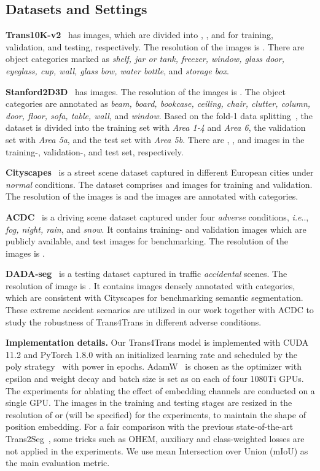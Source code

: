 \documentclass[journal]{IEEEtran}
\makeatletter
\DeclareRobustCommand\onedot{\futurelet\@let@token\@onedot}
\def\@onedot{\ifx\@let@token.\else.\null\fi\xspace}
\def\ie{\emph{i.e}\onedot} \def\Ie{\emph{I.e}\onedot}
\makeatother
\begin{document}
\subsection{Datasets and Settings}
\label{sec:settings}
\noindent\textbf{Trans10K-v2}~\cite{xie2021segmenting} has  images, which are divided into , , and  for training, validation, and testing, respectively. The  resolution of the images is . There are  object categories marked as \emph{shelf, jar or tank, freezer, window, glass door, eyeglass, cup, wall, glass bow, water bottle}, and \emph{storage box}.

\noindent\textbf{Stanford2D3D}~\cite{stanford2d3d} has  images. The resolution of the images is . The  object categories are annotated as \emph{beam, board, bookcase, ceiling, chair, clutter, column, door, floor, sofa, table, wall}, and \emph{window}. Based on the fold-1 data splitting~\cite{stanford2d3d}, the dataset is divided into the training set with \emph{Area 1-4} and \emph{Area 6}, the validation set with \emph{Area 5a}, and the test set with \emph{Area 5b}. There are , , and  images in the training-, validation-, and test set, respectively. 

\noindent\textbf{Cityscapes}~\cite{cityscapes} is a street scene dataset captured in  different European cities under \emph{normal} conditions. The dataset comprises  and  images for training and validation. The resolution of the images is  and the images are annotated with  categories.

\noindent\textbf{ACDC}~\cite{sakaridis2021acdc} is a driving scene dataset captured under four \emph{adverse} conditions, \ie, \emph{fog, night, rain}, and \emph{snow}. It contains  training- and  validation images which are publicly available, and  test images for benchmarking. The resolution of the images is .

\noindent\textbf{DADA-seg}~\cite{zhang2021issafe} is a testing dataset captured in traffic \emph{accidental} scenes. The resolution of image is . It contains  images densely annotated with  categories, which are consistent with Cityscapes for benchmarking semantic segmentation. These extreme accident scenarios are utilized in our work together with ACDC to study the robustness of Trans4Trans in different adverse conditions.

\noindent\textbf{Implementation details.}
Our Trans4Trans model is implemented with  CUDA 11.2 and PyTorch 1.8.0 with an initialized learning rate  and scheduled by the poly strategy~\cite{bisenet} with power  in  epochs. AdamW~\cite{adam_optimization} is chosen as the optimizer with epsilon  and weight decay  and batch size is set as  on each of four 1080Ti GPUs. The experiments for ablating the effect of embedding channels are conducted on a single GPU. The images in the training and testing stages are resized in the resolution of  or  (will be specified) for the experiments, to maintain the shape of position embedding. For a fair comparison with the previous state-of-the-art Trans2Seg~\cite{xie2021segmenting}, some tricks such as OHEM, auxiliary and class-weighted losses are not applied in the experiments. We use mean Intersection over Union (mIoU) as the main evaluation metric.
\end{document}

